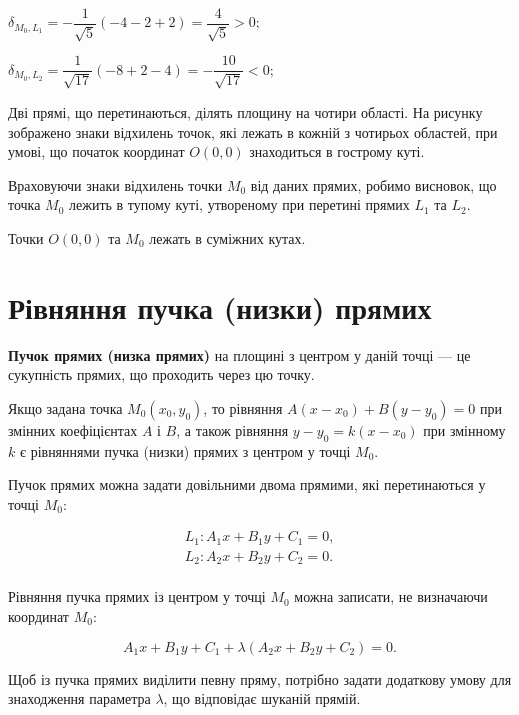 \begin{solution}
{}
	\parbox{\textwidth - 2.5cm}{
		$\delta_{M_0,L_1} = -\dfrac{1}{\sqrt{5}}(-4 -2 +2) = \dfrac{4}{\sqrt{5}} > 0;$
	
		$\delta_{M_0,L_2} = \dfrac{1}{\sqrt{17}}(-8 +2 -4) = -\dfrac{10}{\sqrt{17}} < 0;$
	
		Дві прямі, що перетинаються, ділять площину на
		чотири області. На рисунку зображено знаки відхилень
		точок, які лежать в кожній з чотирьох областей, при умові, що початок координат
		$O(0,0)$ знаходиться в гострому куті.
	}
	
	Враховуючи знаки відхилень точки $M_0$ від даних прямих, робимо висновок,
	що точка $M_0$ лежить в тупому куті, утвореному при перетині прямих $L_1$ та $L_2$.
	
	Точки $O(0,0)$ та $M_0$ лежать в суміжних кутах. 
\end{solution}

\section{Рівняння пучка (низки) прямих}

\begin{definition}
	\textbf{Пучок прямих (низка прямих)} на площині з центром у даній точці --- це  
	сукупність прямих, що проходить через цю точку.
\end{definition}

Якщо задана точка $M_0(x_0,y_0)$, то рівняння $A(x - x_0) + B(y - y_0) = 0$ при
змінних коефіцієнтах $A$ і $B$, а також рівняння $y-y_0 = k(x-x_0)$ при змінному $k$
є рівняннями пучка (низки) прямих з центром у точці $M_0$.

Пучок прямих можна задати довільними двома прямими, які перетинаються у
точці $M_0$:

$$\begin{array}{l}
	L_1: A_1x + B_1y + C_1 = 0,\\
	L_2: A_2x + B_2y + C_2 = 0.\\
\end{array}$$

Рівняння пучка прямих із центром у точці $M_0$ можна записати, не визначаючи
координат $M_0$:

$$A_1x + B_1y + C_1 + \lambda(A_2x + B_2y + C_2) = 0.$$

Щоб із пучка прямих виділити певну пряму, потрібно задати додаткову умову
для знаходження параметра $\lambda$, що відповідає шуканій прямій. 

